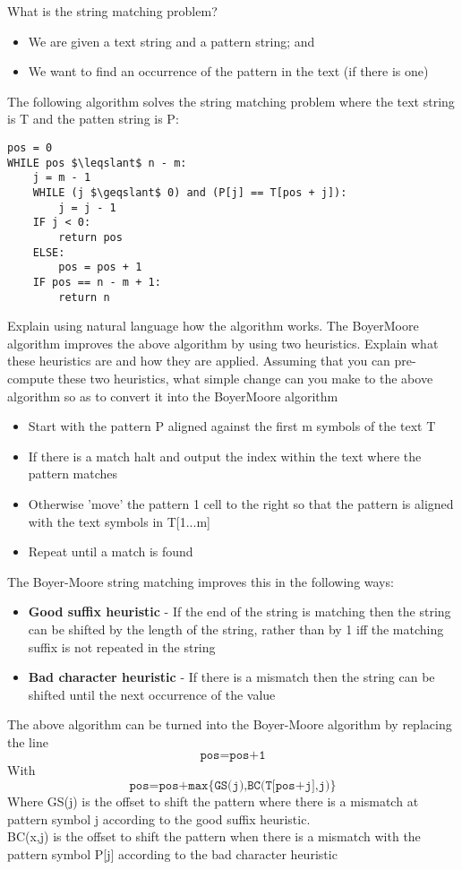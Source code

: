 \documentclass[addpoints]{exam}
\begin{document}
\begin{questions}
\question[2]What is the string matching problem?
\begin{solution}[2in]
\begin{itemize}
	\item We are given a text string and a pattern string; and
	\item We want to find an occurrence of the pattern in the text (if there is one)
\end{itemize}
\end{solution}
\newpage
\question[15]
The following algorithm solves the string matching problem where the text string is T and the patten string is P:
\begin{lstlisting}
pos = 0
WHILE pos $\leqslant$ n - m:
	j = m - 1
	WHILE (j $\geqslant$ 0) and (P[j] == T[pos + j]):
		j = j - 1
	IF j < 0:
		return pos
	ELSE:
		pos = pos + 1
	IF pos == n - m + 1:
		return n
\end{lstlisting}
Explain using natural language how the algorithm works. The BoyerMoore algorithm improves the above algorithm by using two heuristics.
Explain what these heuristics are and how they are applied. Assuming
that you can pre-compute these two heuristics, what simple change can
you make to the above algorithm so as to convert it into the BoyerMoore algorithm
\begin{solution}[2in]
	\begin{itemize}
		\item  Start with the pattern P aligned against the first m symbols of the text T
		\item If there is a match halt and output the index within the text where the pattern matches
		\item Otherwise 'move' the pattern 1 cell to the right so that the pattern is aligned with the text symbols in T[1...m]
		\item Repeat until a match is found
	\end{itemize}
The Boyer-Moore string matching improves this in the following ways:
\begin{itemize}
	\item \textbf{Good suffix heuristic} - If the end of the string is matching  then the string can be shifted by the length of the string, rather than by 1 iff the matching suffix is not repeated in the string
	\item \textbf{Bad character heuristic} - If there is a mismatch then the string can be shifted until the next occurrence of the value
\end{itemize}
The above algorithm can be turned into the Boyer-Moore algorithm by replacing the line
$$\texttt{pos=pos+1}$$
With
$$\texttt{pos=pos+max\{GS(j),BC(T[pos+j],j)\}}$$
Where GS(j) is the offset to shift the pattern where there is a mismatch at pattern symbol j according to the good suffix heuristic.\\
BC(x,j) is the offset to shift the pattern when there is a mismatch with the pattern symbol P[j] according to the bad character heuristic
\end{solution}


\end{questions}
\end{document}
